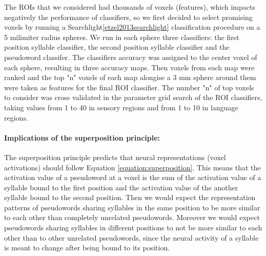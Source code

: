 The ROIs that we considered had thousands of voxels (features), which impacts negatively the performance of classifiers, so we first decided to select promising voxels by running a Searchlight\ref{etzel2013searchlight} classification procedure on a 5 milimiter radius spheres.
We run in each sphere three classifiers: the first position syllable classifier, the second position syllable classifier and the pseudoword classifer.
The classifiers accuracy was assigned to the center voxel of each sphere, resulting in three accuracy maps.
Then voxels from each map were ranked and the top "n" voxels of each map alongise a 3 mm sphere around them were taken as features for the final ROI classifier.
The number "n" of top voxels to consider was cross validated in the parameter grid search of the ROI classifiers, taking values from 1 to 40 in sensory regions and from 1 to 10 in language regions.

% 


\paragraph{Implications of the superposition principle:}
The superposition principle predicts that neural representations (voxel activations) should follow Equation \ref{equation:superposition}.
This means that the activation value of a pseudoword at a voxel is the sum of the activation value of a syllable bound to the first position and the activation value of the another syllable bound to the second position.
Then we would expect the representation patterns of pseudowords sharing syllables in the same position to be more similar to each other than completely unrelated pseudowords.
Moreover we would expect pseudowords sharing syllables in different positions to not be more similar to each other than to other unrelated pseudowords, since the neural activity of a syllable is meant to change after being bound to its position.

